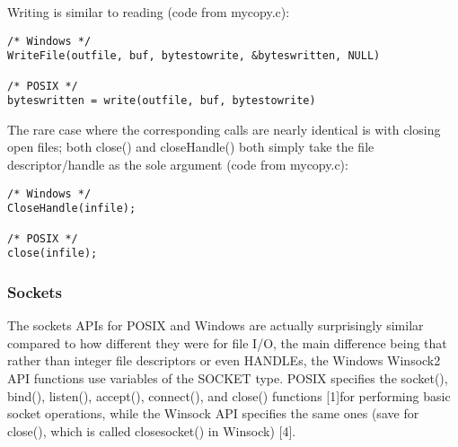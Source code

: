 \documentclass[letterpaper,10pt,fleqn]{article}
\numberwithin{equation}{section}
\begin{document}
Writing is similar to reading (code from mycopy.c):
\begin{verbatim}
/* Windows */
WriteFile(outfile, buf, bytestowrite, &byteswritten, NULL)

/* POSIX */
byteswritten = write(outfile, buf, bytestowrite)
\end{verbatim}

The rare case where the corresponding calls are nearly identical is with closing open files; both close() and closeHandle() both simply take the file descriptor/handle as the sole argument (code from mycopy.c):
\begin{verbatim}
/* Windows */
CloseHandle(infile);

/* POSIX */
close(infile);
\end{verbatim}

\subsubsection*{Sockets}
The sockets APIs for POSIX and Windows are actually surprisingly similar compared to how different they were for file I/O, the main difference being that rather than integer file descriptors or even HANDLEs, the Windows Winsock2 API functions use variables of the SOCKET type.  POSIX specifies the socket(), bind(), listen(), accept(), connect(), and close() functions {[}1{]}for performing basic socket operations, while the Winsock API specifies the same ones (save for close(), which is called closesocket() in Winsock) {[}4{]}.
\end{document}

